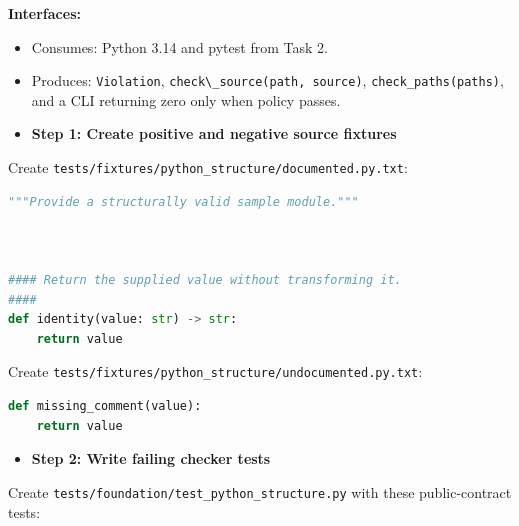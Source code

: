 \documentclass[
  letterpaper,
]{article}
\newcommand{\passthrough}[1]{#1}
\providecommand{\tightlist}{%
  \setlength{\itemsep}{0pt}\setlength{\parskip}{0pt}}
\begin{document}
\textbf{Interfaces:}

\begin{itemize}
\tightlist
\item
  Consumes: Python 3.14 and pytest from Task 2.
\item
  Produces: \passthrough{\lstinline!Violation!}, \passthrough{\lstinline!check\_source(path, source)!},
  \nolinkurl{check_paths(paths)}, and a CLI returning zero only when policy passes.
\end{itemize}

\begin{itemize}
\tightlist
\item[$\boxtimes$]
  \textbf{Step 1: Create positive and negative source fixtures}
\end{itemize}

Create \nolinkurl{tests/fixtures/python_structure/documented.py.txt}:

\begin{lstlisting}[language=Python]
"""Provide a structurally valid sample module."""



#### Return the supplied value without transforming it.
####
def identity(value: str) -> str:
    return value
\end{lstlisting}

Create \nolinkurl{tests/fixtures/python_structure/undocumented.py.txt}:

\begin{lstlisting}[language=Python]
def missing_comment(value):
    return value
\end{lstlisting}

\begin{itemize}
\tightlist
\item[$\boxtimes$]
  \textbf{Step 2: Write failing checker tests}
\end{itemize}

Create \nolinkurl{tests/foundation/test_python_structure.py} with these public-contract tests:
\end{document}

